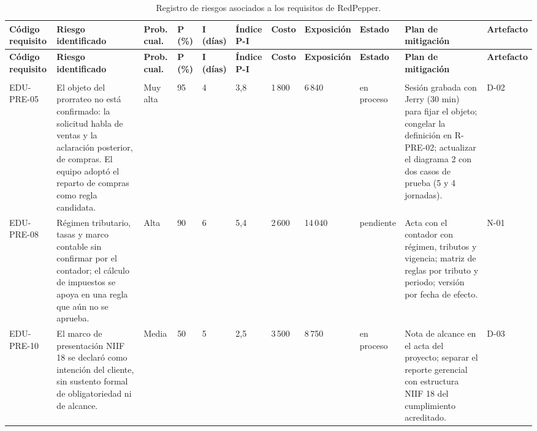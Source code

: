 \begin{landscape}
{\footnotesize\setlength{\tabcolsep}{2pt}\renewcommand{\arraystretch}{1.1}
\begin{longtable}{L{2.2cm} L{4.0cm} L{1.6cm} L{1.0cm} L{1.1cm} L{1.3cm} L{1.3cm} L{2.5cm} L{1.6cm} L{4.8cm} L{1.6cm}}
\caption{Registro de riesgos asociados a los requisitos de RedPepper.}
\label{tab:riesgos-registro}\\
\toprule
\textbf{Código requisito} & \textbf{Riesgo identificado} & \textbf{Prob. cual.} & \textbf{P (\%)} & \textbf{I (días)} & \textbf{Índice P-I} & \textbf{Costo} & \textbf{Exposición} & \textbf{Estado} & \textbf{Plan de mitigación} & \textbf{Artefacto} \\
\midrule
\endfirsthead
\toprule
\textbf{Código requisito} & \textbf{Riesgo identificado} & \textbf{Prob. cual.} & \textbf{P (\%)} & \textbf{I (días)} & \textbf{Índice P-I} & \textbf{Costo} & \textbf{Exposición} & \textbf{Estado} & \textbf{Plan de mitigación} & \textbf{Artefacto} \\
\midrule
\endhead
\bottomrule
\endfoot
{} \\
EDU-PRE-05 & El objeto del prorrateo no está confirmado: la solicitud habla de ventas y la aclaración posterior, de compras. El equipo adoptó el reparto de compras como regla candidata. & Muy alta & 95 & 4 & 3,8 & 1\,800 & 6\,840 & en proceso & Sesión grabada con Jerry (30 min) para fijar el objeto; congelar la definición en R-PRE-02; actualizar el diagrama 2 con dos casos de prueba (5 y 4 jornadas). & D-02 \\
EDU-PRE-08 & Régimen tributario, tasas y marco contable sin confirmar por el contador; el cálculo de impuestos se apoya en una regla que aún no se aprueba. & Alta & 90 & 6 & 5,4 & 2\,600 & 14\,040 & pendiente & Acta con el contador con régimen, tributos y vigencia; matriz de reglas por tributo y periodo; versión por fecha de efecto. & N-01 \\
EDU-PRE-10 & El marco de presentación NIIF 18 se declaró como intención del cliente, sin sustento formal de obligatoriedad ni de alcance. & Media & 50 & 5 & 2,5 & 3\,500 & 8\,750 & en proceso & Nota de alcance en el acta del proyecto; separar el reporte gerencial con estructura NIIF 18 del cumplimiento acreditado. & D-03 \\

\end{longtable}}
\end{landscape}
